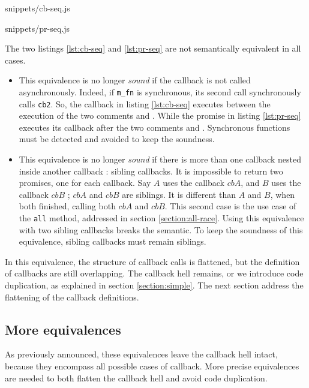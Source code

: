              {snippets/cb-seq.js}

             {snippets/pr-seq.js}

The two listings \ref{lst:cb-seq} and \ref{lst:pr-seq} are not semantically equivalent in all cases.
\begin{itemize}
\item This equivalence is no longer \textit{sound} if the callback is not called asynchronously.
Indeed, if \texttt{m_fn} is synchronous, its second call synchronously calls \texttt{cb2}.
So, the callback in listing \ref{lst:cb-seq} executes between the execution of the two comments  and .
While the promise in listing \ref{lst:pr-seq} executes its callback after the two comments  and .
Synchronous functions must be detected and avoided to keep the soundness.
\item This equivalence is no longer \textit{sound} if there is more than one callback nested inside another callback : sibling callbacks.
It is impossible to return two promises, one for each callback.
Say $A$ uses the callback $cbA$, and $B$ uses the callback $cbB$ ; $cbA$ and $cbB$ are siblings.
It is different than $A$ and $B$, when both finished, calling both $cbA$ and $cbB$.
This second case is the use case of the \texttt{all} method, addressed in section \ref{section:all-race}.
Using this equivalence with two sibling callbacks breaks the semantic.
To keep the soundness of this equivalence, sibling callbacks must remain siblings.
\end{itemize}
In this equivalence, the structure of callback calls is flattened, but the definition of callbacks are still overlapping.
The callback hell remains, or we introduce code duplication, as explained in section \ref{section:simple}.
The next section address the flattening of the callback definitions.

\subsection{More equivalences} \label{section:more}

As previously announced, these equivalences leave the callback hell intact, because they encompass all possible cases of callback.
More precise equivalences are needed to both flatten the callback hell and avoid code duplication.

